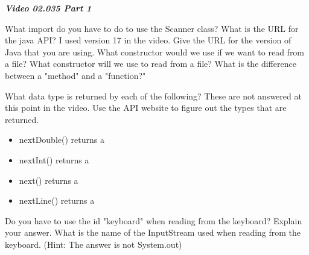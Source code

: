 \documentclass[letterpaper,11pt]{exam}
\newcommand{\videoheading}[1]{\Large\textbf{\textit{#1}}}
\begin{document}
\videoheading{Video 02.035 Part 1}


\begin{questions}
    \question What import do you have to do to use the Scanner class?
    \question What is the URL for the java API?  I used version 17 in the video.  Give the URL for the version of Java that you are using.
    \question What constructor would we use if we want to read from a file?
    \question What constructor will we use to read from a file?
    \question What is the difference between a "method" and a "function?"
    \begin{samepage}
    \question What data type is returned by each of the following?  These are not answered at this point in the video.  Use the API website to figure out the types that are returned.
    \begin{itemize}
      \item nextDouble() returns a \makebox[2in]{\hrulefill}
      \item nextInt() returns a \makebox[2in]{\hrulefill}
      \item next() returns a \makebox[2in]{\hrulefill}
      \item nextLine() returns a \makebox[2in]{\hrulefill}
    \end{itemize}
    \end{samepage}

\question Do you have to use the id "keyboard" when reading from the keyboard?  Explain your answer.
\vspace{1cm}
\question What is the name of the InputStream used when reading from the keyboard.  (Hint:  The answer is not System.out)


\end{questions}
\end{document}
